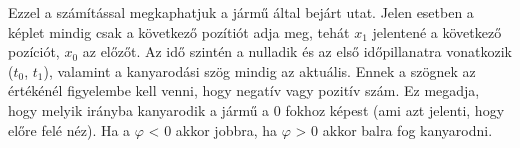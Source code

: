 Ezzel a számítással megkaphatjuk a jármű által bejárt utat. Jelen esetben a képlet mindig csak a következő pozítiót adja meg, tehát $x_1$ jelentené a következő pozíciót, $x_0$ az előzőt. Az idő szintén a nulladik és az első időpillanatra vonatkozik ($t_0$, $t_1$), valamint a kanyarodási szög mindig az aktuális. Ennek a szögnek az értékénél figyelembe kell venni, hogy negatív vagy pozitív szám. Ez megadja, hogy melyik irányba kanyarodik a jármű a 0 fokhoz képest (ami azt jelenti, hogy előre felé néz). Ha a $\varphi$ < 0 akkor jobbra, ha $\varphi$ > 0  akkor balra fog kanyarodni. 




